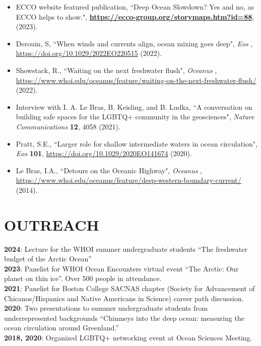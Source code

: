 \documentclass[paper=letter,fontsize=11pt]{scrartcl} %
\newcommand{\NewPart}[2]{\section*{\uppercase{#1} #2}}
\newcommand{\ShortEntry}[2]{\normalsize \noindent \textbf{#1}: #2 \\ }
\newcommand{\PaperEntry}[6]{
		\noindent #1, ``#2", \textit{#3} \textbf{#4}, #5 (#6).}
\begin{document}
\begin{itemize}

\item \PaperEntry{ECCO website featured publication}{Deep Ocean Slowdown? Yes and no, as ECCO helps to show.}{}{\url{https://ecco-group.org/storymaps.htm?id=88}}{}{2023}

\item \PaperEntry{Derouin, S}{When winds and currents align, ocean mixing goes deep}{Eos}{}{\url{https://doi.org/10.1029/2022EO220515}}{2022}

\item \PaperEntry{Showstack, R.}{Waiting on the next freshwater flush}{Oceanus}{}{\url{https://www.whoi.edu/oceanus/feature/waiting-on-the-next-freshwater-flush/}}{2022}

\item \PaperEntry{Interview with I. A. Le Bras, B. Keisling, and B. Ludka}{A conversation on building safe spaces for the LGBTQ+ community in the geosciences}{Nature Communications}{12}{4058}{2021}

\item \PaperEntry{Pratt, S.E.}{Larger role for shallow intermediate waters in ocean circulation}{Eos}{101}{\url{ https://doi.org/10.1029/2020EO141674}}{2020}

\item \PaperEntry{Le Bras, I.A.}{Detours on the Oceanic Highway}{Oceanus}{}{\url{ https://www.whoi.edu/oceanus/feature/deep-western-boundary-current/}}{2014}
\end{itemize}


\NewPart{Outreach}{}

\ShortEntry{2024}{Lecture for the WHOI summer undergraduate students ``The freshwater budget of the Arctic Ocean''}

\ShortEntry{2023}{Panelist for WHOI Ocean Encounters virtual event ``The Arctic: Our planet on thin ice''. Over 500 people in attendance.}

\ShortEntry{2021}{Panelist for Boston College SACNAS chapter (Society for Advancement of Chicanos/Hispanics and Native Americans in Science) career path discussion.}

\ShortEntry{2020}{Two presentations to summer undergraduate students from underrepresented backgrounds ``Chimneys into the deep ocean: measuring the ocean circulation around Greenland.''}

\ShortEntry{2018, 2020}{Organized LGBTQ+ networking event at Ocean Sciences Meeting.}
\end{document}

